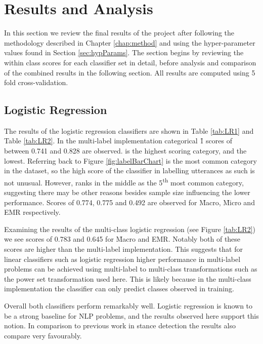 \documentclass[Dissertation.tex]{subfiles}
\begin{document}
\section{Results and Analysis}
In this section we review the final results of the project after following the methodology described in Chapter \ref{chap:method} and using the hyper-parameter values found in Section \ref{sec:hypParams}. The section begins by reviewing the within class scores for each classifier set in detail, before analysis and comparison of the combined results in the following section. All results are computed using 5 fold cross-validation.

\subsection{Logistic Regression}
The results of the logistic regression classifiers are shown in Table \ref{tab:LR1} and Table \ref{tab:LR2}.
In the multi-label implementation categorical \f{1} scores of between 0.741 and 0.828 are observed.  is the highest scoring category, and  the lowest. Referring back to Figure \ref{fig:labelBarChart}  is the most common category in the dataset, so the high score of the classifier in labelling utterances as such is not unusual. However,  ranks in the middle as the 5\textsuperscript{th} most common category, suggesting there may be other reasons besides sample size influencing the lower performance. Scores of 0.774, 0.775 and 0.492 are observed for \f{Macro}, \f{Micro} and EMR respectively. 

Examining the results of the multi-class logistic regression (see Figure \ref{tab:LR2}) we see scores of 0.783 and 0.645 for \f{Macro} and EMR. Notably both of these scores are higher than the multi-label implementation. This suggests that for linear classifiers such as logistic regression higher performance in multi-label problems can be achieved using multi-label to multi-class transformations such as the power set transformation used here. This is likely because in the multi-class implementation the classifier can only predict classes observed in training. 

Overall both classifiers perform remarkably well. Logistic regression is known to be a strong baseline for NLP problems, and the results observed here support this notion. In comparison to previous work in stance detection the results also compare very favourably.
\end{document}
